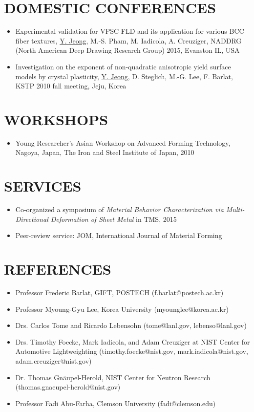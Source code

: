 \documentclass{res}
\begin{document}
\begin{resume}
  \section{DOMESTIC CONFERENCES}
  \begin{itemize}
  \item Experimental validation for VPSC-FLD and its application for various BCC fiber textures, \underline{Y. Jeong}, M.-S. Pham, M. Iadicola, A. Creuziger, NADDRG (North American Deep Drawing Research Group) 2015, Evanston IL, USA
  \item Investigation on the exponent of non-quadratic anisotropic yield surface models by crystal plasticity, \underline{Y. Jeong}, D. Steglich, M.-G. Lee, F. Barlat, KSTP 2010 fall meeting, Jeju, Korea
  \end{itemize}

  \section{WORKSHOPS}
  \begin{itemize}
  \item Young Researcher's Asian Workshop on Advanced Forming Technology, Nagoya, Japan, The Iron and Steel Institute of Japan, 2010
  \end{itemize}

  \section{SERVICES}
  \begin{itemize}
  \item Co-organized a symposium of {\it Material Behavior Characterization via Multi-Directional Deformation of Sheet Metal} in TMS, 2015
  \item Peer-review service: JOM, International Journal of Material Forming
  \end{itemize}

  \section{REFERENCES}
  \begin{itemize}
  \item Professor Frederic Barlat, GIFT, POSTECH (f.barlat@postech.ac.kr)
  \item Professor Myoung-Gyu Lee, Korea University (myounglee@korea.ac.kr)
  \item Drs. Carlos Tome and Ricardo Lebensohn (tome@lanl.gov, lebenso@lanl.gov)
  \item Drs. Timothy Foecke, Mark Iadicola, and Adam Creuziger at NIST Center for Automotive Lightweighting (timothy.foecke@nist.gov, mark.iadicola@nist.gov, adam.creuziger@nist.gov)
  \item Dr. Thomas Gn\"aupel-Herold, NIST Center for Neutron Research (thomas.gnaeupel-herold@nist.gov)
  \item Professor Fadi Abu-Farha, Clemson University (fadi@clemson.edu)
  \end{itemize}

\end{resume}
\end{document}
